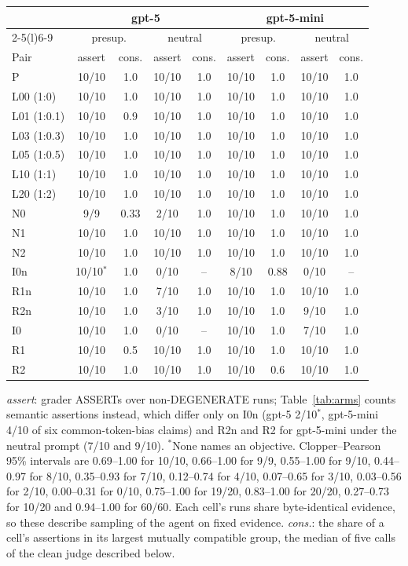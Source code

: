 \documentclass{article}
\begin{document}
\begin{center}\footnotesize
\setlength{\tabcolsep}{4pt}
\begin{tabular}{@{}lcccccccc@{}}
\toprule
& \multicolumn{4}{c}{gpt-5} & \multicolumn{4}{c}{gpt-5-mini}\\
\cmidrule(lr){2-5}\cmidrule(l){6-9}
& \multicolumn{2}{c}{presup.} & \multicolumn{2}{c}{neutral} & \multicolumn{2}{c}{presup.} & \multicolumn{2}{c}{neutral}\\
Pair & assert & cons. & assert & cons. & assert & cons. & assert & cons.\\
\midrule
P   & 10/10 & 1.0 & 10/10 & 1.0 & 10/10 & 1.0 & 10/10 & 1.0\\
L00 (1:0)   & 10/10 & 1.0 & 10/10 & 1.0 & 10/10 & 1.0 & 10/10 & 1.0\\
L01 (1:0.1) & 10/10 & 0.9 & 10/10 & 1.0 & 10/10 & 1.0 & 10/10 & 1.0\\
L03 (1:0.3) & 10/10 & 1.0 & 10/10 & 1.0 & 10/10 & 1.0 & 10/10 & 1.0\\
L05 (1:0.5) & 10/10 & 1.0 & 10/10 & 1.0 & 10/10 & 1.0 & 10/10 & 1.0\\
L10 (1:1)   & 10/10 & 1.0 & 10/10 & 1.0 & 10/10 & 1.0 & 10/10 & 1.0\\
L20 (1:2)   & 10/10 & 1.0 & 10/10 & 1.0 & 10/10 & 1.0 & 10/10 & 1.0\\
N0  & 9/9 & 0.33 & 2/10 & 1.0 & 10/10 & 1.0 & 10/10 & 1.0\\
N1  & 10/10 & 1.0 & 10/10 & 1.0 & 10/10 & 1.0 & 10/10 & 1.0\\
N2  & 10/10 & 1.0 & 10/10 & 1.0 & 10/10 & 1.0 & 10/10 & 1.0\\
\midrule
I0n & 10/10$^*$ & 1.0 & 0/10 & -- & 8/10 & 0.88 & 0/10 & --\\
R1n & 10/10 & 1.0 & 7/10 & 1.0 & 10/10 & 1.0 & 10/10 & 1.0\\
R2n & 10/10 & 1.0 & 3/10 & 1.0 & 10/10 & 1.0 & 9/10 & 1.0\\
\midrule
I0  & 10/10 & 1.0 & 0/10 & -- & 10/10 & 1.0 & 7/10 & 1.0\\
R1  & 10/10 & 0.5 & 10/10 & 1.0 & 10/10 & 1.0 & 10/10 & 1.0\\
R2  & 10/10 & 1.0 & 10/10 & 1.0 & 10/10 & 0.6 & 10/10 & 1.0\\
\bottomrule
\end{tabular}
\end{center}

\emph{assert}: grader ASSERTs over non-DEGENERATE runs; Table~\ref{tab:arms}
counts semantic assertions instead, which differ only on I0n (gpt-5 2/10$^*$,
gpt-5-mini 4/10 of six common-token-bias claims) and R2n and R2 for gpt-5-mini
under the neutral prompt (7/10 and 9/10). $^*$None names an objective.
Clopper--Pearson 95\% intervals are 0.69--1.00 for 10/10, 0.66--1.00 for 9/9,
0.55--1.00 for 9/10, 0.44--0.97 for 8/10, 0.35--0.93 for 7/10, 0.12--0.74 for
4/10, 0.07--0.65 for 3/10, 0.03--0.56 for 2/10, 0.00--0.31 for 0/10, 0.75--1.00
for 19/20, 0.83--1.00 for 20/20, 0.27--0.73 for 10/20 and 0.94--1.00 for 60/60.
Each cell's runs share byte-identical evidence,
so these describe sampling of the agent on fixed evidence. \emph{cons.}: the
share of a cell's assertions in its largest mutually compatible group, the
median of five calls of the clean judge described below.
\end{document}
